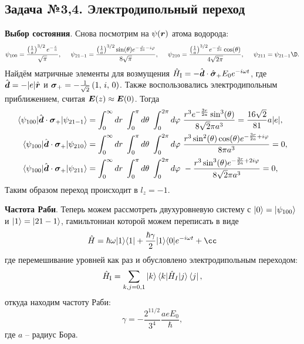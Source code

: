 \subsection*{Задача №3,4. Электродипольный переход}

\textbf{Выбор состояния}.
Снова посмотрим на $\psi(\mbox{\boldmath $r$})$ атома водорода:
\begin{equation*}
	\psi_{100} = \frac{\left(\frac{1}{a}\right)^{3/2} e^{-\frac{r}{a}}}{\sqrt{\pi }},
	\hspace{5mm}
	\psi_{21-1} = \frac{\left(\frac{1}{a}\right)^{3/2} \sin (\theta ) e^{-\frac{r}{2 a}-i \varphi }}{8 \sqrt{\pi }},
	\hspace{5 mm} 
	\psi_{210} = \frac{\left(\frac{1}{a}\right)^{3/2} e^{-\frac{r}{2 a}} \cos (\theta )}{4 \sqrt{2 \pi }},
	\hspace{5 mm} 
	\psi_{211} = \psi_{21-1}\D.
\end{equation*}
Найдём матричные элементы для возмущения
$\hat{H}_{\textnormal{I}} = - \hat{\mbox{\boldmath $d$}} \cdot \hat{\mbox{\boldmath $\sigma$}}_+ E_0 e^{-i \omega t}$, где
$\hat{\mbox{\boldmath $d$}} = - |e| \hat{\mbox{\boldmath $r$}}$ и $\mbox{\boldmath $\sigma$}_+ = -\frac{1}{\sqrt{2}}\left(1,\, i,\, 0\right)$. Также воспользовались электродипольным приближением, считая $\mbox{\boldmath $E$}(z) \approx	\mbox{\boldmath $E$}(0)$. Тогда
\begin{align*}
	\bk{\psi_{100}}[\hat{\vc{d}} \cdot \vc{\sigma}_+]{\psi_{21-1}} &= \int_{0}^{\infty} dr\ \int_{0}^{\pi} d \theta\ \int_{0}^{2\pi} d \varphi \ 
		\frac{r^3 e^{-\frac{3 r}{2 a}} \sin ^3(\theta )}{8 \sqrt{2} \pi  a^3} 
		= \frac{16 \sqrt{2}}{81} a |e|, \\
	\bk{\psi_{100}}[\hat{\vc{d}} \cdot \vc{\sigma}_+]{\psi_{210}} &= \int_{0}^{\infty} dr\ \int_{0}^{\pi} d \theta\ \int_{0}^{2\pi} d \varphi \ 
		\frac{r^3 \sin ^2(\theta ) \cos (\theta ) e^{-\frac{3 r}{2 a}+i \varphi }}{8 \pi  a^3} 
		= 0, \\
	\bk{\psi_{100}}[\hat{\vc{d}} \cdot \vc{\sigma}_+]{\psi_{211}} &= \int_{0}^{\infty} dr\ \int_{0}^{\pi} d \theta\ \int_{0}^{2\pi} d \varphi \ 
		-\frac{r^3 \sin ^3(\theta ) e^{-\frac{3 r}{2 a}+2 i \varphi }}{8 \sqrt{2} \pi  a^3} 
		= 0,
\end{align*}
Таким образом переход происходит в $l_z = -1$. 

\textbf{Частота Раби}. Теперь можем рассмотреть двухуровневую систему с $\left| 0 \right\rangle = \left| \psi_{100} \right\rangle$ и $\left| 1 \right\rangle = \left| 21-1 \right\rangle$, гамильтониан которой можем переписать в виде
\begin{equation*}
	\hat{H} = \hbar \omega \kb{1}{1} + \frac{\hbar \gamma}{2} \kb{1}{0} e^{-i \omega t} + \cc
\end{equation*}
где перемешивание уровней как раз и обусловлено электродипольным переходом:
\begin{equation*}
	\sub{\hat{H}}{I} = \sum_{k, j = 0, 1} \ket{k} \bk{k}[\hat{H}_I]{j} \bra{j},
\end{equation*}
откуда находим частоту Раби:
\begin{equation*}
	\gamma = -\frac{2^{11/2}}{3^{4}} \frac{a e E_0}{\hbar},
\end{equation*}
где $a$ -- радиус Бора.
